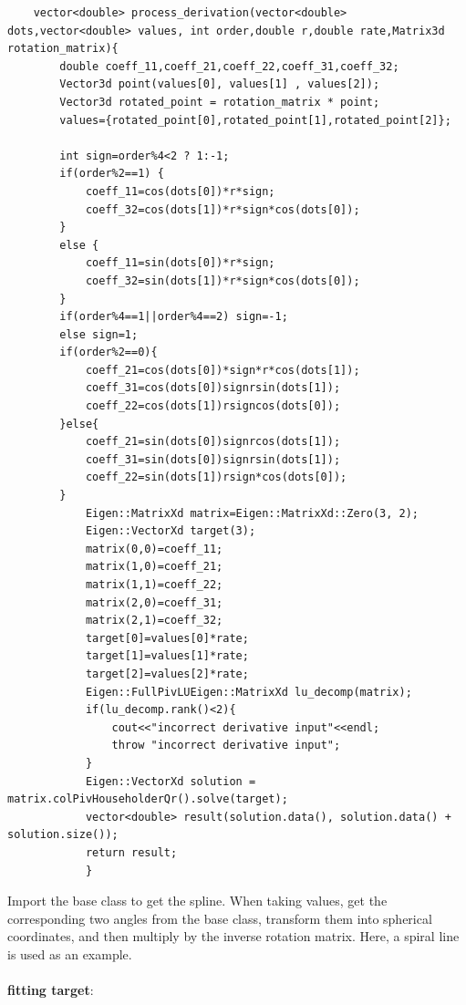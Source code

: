 \documentclass[a4paper]{article}
\begin{document}
\begin{verbatim}
    vector<double> process_derivation(vector<double> dots,vector<double> values, int order,double r,double rate,Matrix3d rotation_matrix){
        double coeff_11,coeff_21,coeff_22,coeff_31,coeff_32;
        Vector3d point(values[0], values[1] , values[2]);
        Vector3d rotated_point = rotation_matrix * point;
        values={rotated_point[0],rotated_point[1],rotated_point[2]};

        int sign=order%4<2 ? 1:-1;
        if(order%2==1) {
            coeff_11=cos(dots[0])*r*sign;
            coeff_32=cos(dots[1])*r*sign*cos(dots[0]);
        }
        else {
            coeff_11=sin(dots[0])*r*sign;
            coeff_32=sin(dots[1])*r*sign*cos(dots[0]);
        }
        if(order%4==1||order%4==2) sign=-1;
        else sign=1;
        if(order%2==0){
            coeff_21=cos(dots[0])*sign*r*cos(dots[1]);
            coeff_31=cos(dots[0])signrsin(dots[1]);
            coeff_22=cos(dots[1])rsigncos(dots[0]);
        }else{
            coeff_21=sin(dots[0])signrcos(dots[1]);
            coeff_31=sin(dots[0])signrsin(dots[1]);
            coeff_22=sin(dots[1])rsign*cos(dots[0]);
        }
            Eigen::MatrixXd matrix=Eigen::MatrixXd::Zero(3, 2);
            Eigen::VectorXd target(3);
            matrix(0,0)=coeff_11;
            matrix(1,0)=coeff_21;
            matrix(1,1)=coeff_22;
            matrix(2,0)=coeff_31;
            matrix(2,1)=coeff_32;
            target[0]=values[0]*rate;
            target[1]=values[1]*rate;
            target[2]=values[2]*rate;
            Eigen::FullPivLUEigen::MatrixXd lu_decomp(matrix);
            if(lu_decomp.rank()<2){
                cout<<"incorrect derivative input"<<endl;
                throw "incorrect derivative input";
            }
            Eigen::VectorXd solution = matrix.colPivHouseholderQr().solve(target);
            vector<double> result(solution.data(), solution.data() + solution.size());
            return result;
            }
    \end{verbatim}
            
    Import the base class to get the spline.
    When taking values, get the corresponding two angles from the base class, transform them into spherical coordinates, and then multiply by the inverse rotation matrix.
    Here, a spiral line is used as an example.\\
    \\
    \textbf{fitting target}:\\
\end{document}
